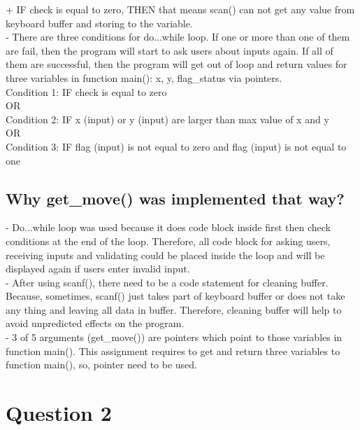 \documentclass[a4paper,12pt]{article}
\begin{document}
\hspace*{1cm}+ IF check is equal to zero, THEN that means scan() can not get any value from keyboard buffer and storing to the variable.\\
- There are three conditions for do...while loop. If one or more than one of them are fail, then the program will start to ask users about inputs again. If all of them are successful, then the program will get out of loop and return values for three variables in function main(): x, y, flag\_status via pointers.\\
\newline{}
Condition 1: IF check is equal to zero\\
OR\\
Condition 2: IF x (input) or y (input) are larger than max value of x and y\\
OR\\
Condition 3: IF flag (input) is not equal to zero and flag (input) is not equal to one\\
\newline{}
\subsection*{Why get\_move() was implemented that way?}
- Do...while loop was used because it does code block inside first then check conditions at the end of the loop. Therefore, all code block for asking users, receiving inputs and validating could be placed inside the loop and will be displayed again if users enter invalid input.\\
- After using scanf(), there need to be a code statement for cleaning buffer. Because, sometimes, scanf() just takes part of keyboard buffer or does not take any thing and leaving all data in buffer. Therefore, cleaning buffer will help to avoid unpredicted effects on the program.\\
- 3 of 5 arguments (get\_move()) are pointers which point to those variables in function main(). This assignment requires to get and return three variables to function main(), so, pointer need to be used.\\
\section*{Question 2}
\end{document}
